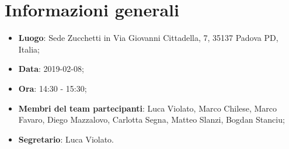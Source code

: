 \section{Informazioni generali}
\begin{itemize}
	\item \textbf{Luogo}: Sede Zucchetti in Via Giovanni Cittadella, 7, 35137 Padova PD, Italia; 
	\item \textbf{Data}: 2019-02-08; 
	\item \textbf{Ora}: 14:30 - 15:30; 
	\item \textbf{Membri del team partecipanti}: Luca Violato, Marco Chilese, Marco Favaro, Diego Mazzalovo, Carlotta Segna, Matteo Slanzi, Bogdan Stanciu; 
	\item \textbf{Segretario}: Luca Violato. 
\end{itemize}